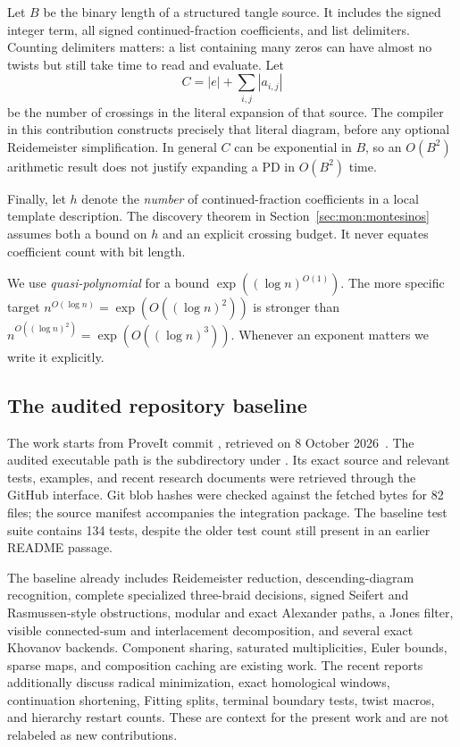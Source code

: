 Let \(B\) be the binary length of a structured tangle source. It includes
the signed integer term, all signed continued-fraction coefficients,
and list delimiters. Counting delimiters matters: a list containing many
zeros can have almost no twists but still take time to read and evaluate.
Let
\[
 C=|e|+\sum_{i,j}|a_{i,j}|
\]
be the number of crossings in the literal expansion of that source.
The compiler in this contribution constructs precisely that literal diagram,
before any optional Reidemeister simplification. In general \(C\) can be
exponential in \(B\), so an \(O(B^2)\) arithmetic result does not justify
expanding a PD in \(O(B^2)\) time.

Finally, let \(h\) denote the \emph{number} of continued-fraction coefficients
in a local template description. The discovery theorem in
Section~\ref{sec:mon:montesinos} assumes both a bound on \(h\) and an explicit
crossing budget. It never equates coefficient count with bit length.

We use \emph{quasi-polynomial} for a bound
\(\exp((\log n)^{O(1)})\). The more specific target
\(n^{O(\log n)}=\exp(O((\log n)^2))\) is stronger than
\(n^{O((\log n)^2)}=\exp(O((\log n)^3))\).
Whenever an exponent matters we write it explicitly.

\subsection{The audited repository baseline}

The work starts from ProveIt commit
, retrieved on 8 October
2026~\cite{proveit-baseline}. The audited executable path is the
 subdirectory under . Its exact source and relevant tests,
examples, and recent research documents were retrieved through the GitHub
interface. Git blob hashes were checked against the fetched bytes for
82 files; the source manifest accompanies the integration package.
The baseline test suite contains 134 tests, despite the older test count
still present in an earlier README passage.

The baseline already includes Reidemeister reduction, descending-diagram
recognition, complete specialized three-braid decisions, signed Seifert
and Rasmussen-style obstructions, modular and exact Alexander paths,
a Jones filter, visible connected-sum and interlacement decomposition,
and several exact Khovanov backends. Component sharing, saturated
multiplicities, Euler bounds, sparse maps, and composition caching are
existing work. The recent reports additionally discuss radical
minimization, exact homological windows, continuation shortening, Fitting
splits, terminal boundary tests, twist macros, and hierarchy restart counts.
These are context for the present work and are not relabeled as new
contributions.

